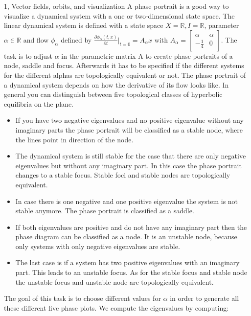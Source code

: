 \documentclass[10pt,a4paper]{article}
\begin{document}
\frontpage

\begin{task}{1, Vector fields, orbits, and visualization}
A phase portrait is a good way to visualize a dynamical system with a one or two-dimensional state space. The linear dynamical system is defined with a state space $X = \mathbb{R}, I = \mathbb{R}$, parameter $\alpha \in \mathbb{R}$ and flow $\phi_{\alpha}$ defined by $\frac{\partial \phi_{\alpha}(t,x)}{\partial t}|_{t=0} = A_{\alpha}x$ with $A_{\alpha} = \begin{bmatrix}\alpha&\alpha \\ -\frac{1}{4}&0\end{bmatrix}$. The task is to adjust $\alpha$ in the parametric matrix A to create phase portraits of a node, saddle and focus. Afterwards it has to be specified if the different systems for the different alphas are topologically equivalent or not. The phase portrait of a dynamical system depends on how the derivative of its flow looks like. In general you can distinguish between five topological classes of hyperbolic equilibria on the plane.
\begin{itemize}
    \item If you have two negative eigenvalues and no positive eigenvalue without any imaginary parts the phase portrait will be classified as a stable node, where the lines point in direction of the node.
    \item The dynamical system is still stable for the case that there are only negative eigenvalues but without any imaginary part. In this case the phase portrait changes to a stable focus. Stable foci and stable nodes are topologically equivalent.
    \item In case there is one negative and one positive eigenvalue the system is not stable anymore. The phase portrait is classified as a saddle.
    \item If both eigenvalues are positive and do not have any imaginary part then the phase diagram can be classified as a node. It is an unstable node, because only systems with only negative eigenvalues are stable.
    \item The last case is if a system has two positive eigenvalues with an imaginary part. This leads to an unstable focus. As for the stable focus and stable node the unstable focus and unstable node are topologically equivalent.
\end{itemize}
The goal of this task is to choose different values for $\alpha$ in order to generate all these different five phase plots. We compute the eigenvalues by computing: \begin{align*}

\end{align*}
\end{task}
\end{document}
